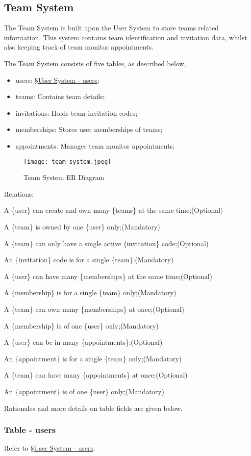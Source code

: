 \documentclass[12pt]{report}
\newcommand{\n}{\par}
\newcommand{\br}{\n\vspace{1 em}\n}
\begin{document}
\subsection{Team System} \label{data-layer.design.team-system}
The Team System is built upon the User System to store teams related information.
This system contains team identification and invitation data,
whilst also keeping track of team monitor appointments.
\br
The Team System consists of five tables, as described below,
\begin{itemize}
	\item users: \S \hyperref[data-layer.design.user-system.users]{User System - users};
	\item teams: Contains team details;
	\item invitations: Holds team invitation codes;
	\item memberships: Stores user memberships of teams;
	\item appointments: Manages team monitor appointments;
\end{itemize}
\br
\begin{figure}[h]
	\centering
	\texttt{[image: team\_system.jpeg]}
	\caption{Team System ER Diagram}
	\label{fig:team-system-er}
\end{figure}
\br
Relations:\n
A \{user\} can create and own many \{teams\} at the same time;\null\hfill (Optional)\n
A \{team\} is owned by one \{user\} only;\null\hfill (Mandatory)
\br
A \{team\} can only have a single active \{invitation\} code;\null\hfill (Optional)\n
An \{invitation\} code is for a single \{team\};\null\hfill (Mandatory)
\br
A \{user\} can have many \{memberships\} at the same time;\null\hfill (Optional)\n
A \{membership\} is for a single \{team\} only;\null\hfill (Mandatory)
\br
A \{team\} can own many \{memberships\} at once;\null\hfill (Optional)\n
A \{membership\} is of one \{user\} only;\null\hfill (Mandatory)
\br
A \{user\} can be in many \{appointments\};\null\hfill (Optional)\n
An \{appointment\} is for a single \{team\} only;\null\hfill (Mandatory)
\br
A \{team\} can have many \{appointments\} at once;\null\hfill (Optional)\n
An \{appointment\} is of one \{user\} only;\null\hfill (Mandatory)
\br
Rationales and more details on table fields are given below.

\subsubsection{Table - users} \label{data-layer.design.team-system.users}
Refer to \S \hyperref[data-layer.design.user-system.users]{User System - users}.
\end{document}

